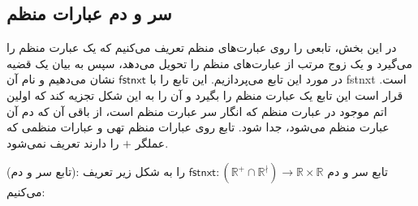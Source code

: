 \subsection{سر و دم عبارات منظم}
در این بخش، تابعی را روی عبارت‌های منظم تعریف می‌کنیم که یک عبارت منظم را می‌گیرد و یک زوج مرتب از عبارت‌های منظم را تحویل می‌دهد، سپس به بیان یک قضیه در مورد این تابع می‌پردازیم. این تابع را با
$\mathsf{fstnxt}$
نشان می‌دهیم و نام آن \gls{fstnxt} است. قرار است این تابع یک عبارت منظم را بگیرد و آن را به این شکل تجزیه کند که اولین اتم موجود در عبارت منظم که انگار سر عبارت منظم است، از باقی آن که دم آن عبارت منظم می‌شود، جدا شود. تابع روی عبارات منظم تهی و عبارات منظمی که عملگر $+$ را دارند تعریف نمی‌شود.
\begin{defn}
	(تابع سر و دم): تابع سر و دم
	$\mathsf{fstnxt}:\mathbb{( \mathbb{R^+ \cap R^\nmid})} \rightarrow \mathbb{R \times R}$ 
	را به شکل زیر تعریف می‌‌کنیم:\\
\end{defn}

